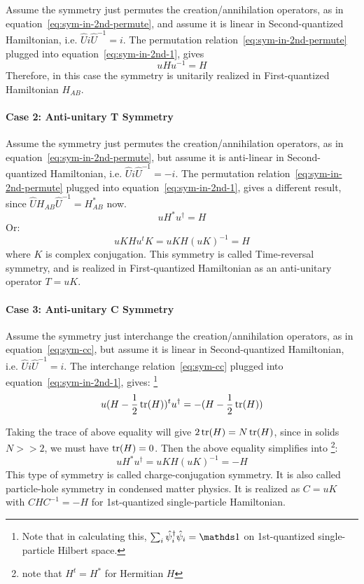 Assume the symmetry just permutes the creation/annihilation operators, as in
equation~\ref{eq:sym-in-2nd-permute}, and assume it is linear in
Second-quantized Hamiltonian, i.e. $\hat{U}i\hat{U}^{-1}=i$. The permutation
relation~\ref{eq:sym-in-2nd-permute} plugged into
equation~\ref{eq:sym-in-2nd-1}, gives
\begin{equation}
u H u^{-1} = H
\end{equation}
Therefore, in this case the symmetry is unitarily realized in First-quantized
Hamiltonian $H_{AB}$.

\paragraph{Case 2: Anti-unitary T Symmetry}
Assume the symmetry just permutes the creation/annihilation operators, as in
equation~\ref{eq:sym-in-2nd-permute}, but assume it is anti-linear in
Second-quantized Hamiltonian, i.e. $\hat{U}i\hat{U}^{-1}=-i$. The permutation
relation~\ref{eq:sym-in-2nd-permute} plugged into
equation~\ref{eq:sym-in-2nd-1}, gives a different result, since
$\hat{U}H_{AB}\hat{U}^{-1} = H_{AB}^*$ now.
\begin{equation}
u H^* u^\dagger = H
\end{equation}
Or:
\begin{equation}
uK H u^t K = uK H (uK)^{-1} = H
\end{equation}
where $K$ is complex conjugation. This symmetry is called Time-reversal
symmetry, and is realized in First-quantized Hamiltonian as an anti-unitary
operator $T= uK$.

\paragraph{Case 3: Anti-unitary C Symmetry}
Assume the symmetry just interchange the creation/annihilation operators, as in
equation~\ref{eq:sym-cc}, but assume it is linear in Second-quantized
Hamiltonian, i.e. $\hat{U}i\hat{U}^{-1}=i$. The interchange
relation~\ref{eq:sym-cc} plugged into equation~\ref{eq:sym-in-2nd-1}, gives:
\footnote{
	Note that in calculating this, $\sum_i\hat\psi^\dagger_i \hat\psi_i =
	\id$ on 1st-quantized single-particle Hilbert space.
}
\begin{equation}
\label{eq:sym-C-cond}
u (H-\frac{1}{2}\tr(H))^t u^\dagger = - (H-\frac{1}{2}\tr(H))
\end{equation}

Taking the trace of above equality will give $2\tr(H)=N\tr(H)$, since
in solids $N>>2$, we must have $\tr(H)=0$. Then the above equality
simplifies into \footnote{note that $H^t = H^*$ for Hermitian $H$}:
\begin{equation}
u H^* u^\dagger = uK H (uK)^{-1} = -H
\end{equation}
This type of symmetry is called charge-conjugation symmetry. It is
also called particle-hole symmetry in condensed matter physics. It is realized
as $C=uK$ with $C H C^{-1} = -H$ for 1st-quantized single-particle Hamiltonian.

